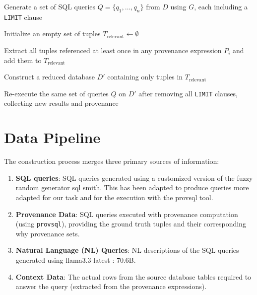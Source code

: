 \documentclass{article}
\begin{document}
\begin{algorithm}[H]
\caption{Provenance-based Dataset Curation}
\label{alg:prov-curation}
\DontPrintSemicolon
{}
\BlankLine

Generate a set of SQL queries $Q = \{q_1, \dots, q_n\}$ from $D$ using $G$, each including a \texttt{LIMIT} clause\;


Initialize an empty set of tuples $T_{\text{relevant}} \leftarrow \emptyset$\;

Extract all tuples referenced at least once in any provenance expression $P_i$ and add them to $T_{\text{relevant}}$\;

Construct a reduced database $D'$ containing only tuples in $T_{\text{relevant}}$\;

Re-execute the same set of queries $Q$ on $D'$ after removing all \texttt{LIMIT} clauses, collecting new results and provenance\;

\;
\end{algorithm}



\section{Data Pipeline}
The construction process merges three primary sources of information:
\begin{enumerate}
    \item \textbf{SQL queries}: SQL queries generated using a customized version of the fuzzy random generator sql smith. This has been adapted to produce queries more adapted for our task and for the execution with the provsql tool.
    \item \textbf{Provenance Data}: SQL queries executed with provenance computation (using \texttt{provsql}), providing the ground truth tuples and their corresponding why provenance sets.
    \item \textbf{Natural Language (NL) Queries}: NL descriptions of the SQL queries generated using llama3.3-latest : 70.6B.
    \item \textbf{Context Data}: The actual rows from the source database tables required to answer the query (extracted from the provenance expressions).
\end{enumerate}
\end{document}
